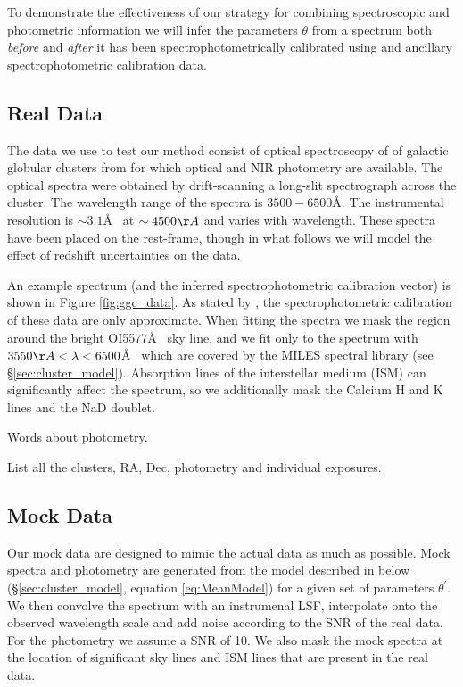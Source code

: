 \documentclass[iop,numberedappendix]{emulateapj}
\begin{document}
To demonstrate the effectiveness of our strategy for combining
spectroscopic and photometric information we will infer the parameters
$\theta$ from a spectrum both \emph{before} and \emph{after} it has
been spectrophotometrically calibrated using and
ancillary spectrophotometric calibration data.



\subsection{Real Data}

The data we use to test our method consist of optical spectroscopy of
of galactic globular clusters from \citet{schiavon05} for which
optical and NIR photometry are available. The optical spectra were
obtained by drift-scanning a long-slit spectrograph across the
cluster.  The wavelength range of the spectra is $3500-6500$\AA. The
instrumental resolution is $\sim 3.1$\AA~ at $\sim 4500\AA$ and varies
with wavelength.  These spectra have been placed on the rest-frame,
though in what follows we will model the effect of redshift
uncertainties on the data.

An example spectrum (and the inferred spectrophotometric calibration
vector) is shown in Figure \ref{fig:ggc_data}.  As stated by
\citet{schiavon05}, the spectrophotometric calibration of these data are
only approximate.  When fitting the spectra we mask the region around
the bright OI5577\AA~ sky line, and we fit only to the spectrum with $3550\AA
< \lambda < 6500$\AA~ which are covered by the MILES spectral library
(see \S\ref{sec:cluster_model}).  Absorption lines of the interstellar
medium (ISM) can significantly affect the spectrum, so we
additionally mask the Calcium H and K lines and the NaD doublet.

Words about photometry.

\begin{table}[h!]
\caption{List all the clusters, RA, Dec, photometry and individual exposures.}
\end{table}


\subsection{Mock Data}
Our mock data are designed to mimic the actual data as much as
possible.  Mock spectra and photometry are generated from the model
described in below (\S\ref{sec:cluster_model}, equation
\ref{eq:MeanModel}) for a given set of parameters $\theta^\prime$.  We
then convolve the spectrum with an instrumenal LSF, interpolate onto
the observed wavelength scale and add noise according to the SNR of
the real data.  For the photometry we assume a SNR of 10.  We also
mask the mock spectra at the location of significant sky lines and ISM
lines that are present in the real data.
\end{document}

